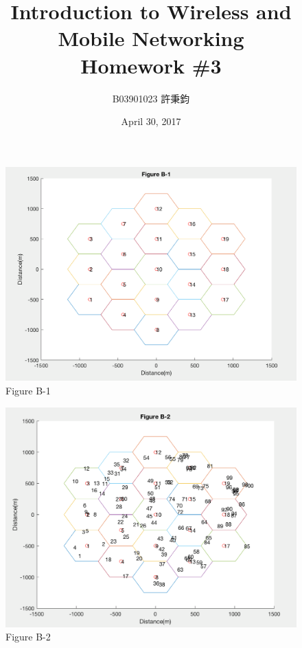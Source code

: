 \documentclass{article}
\title{Introduction to Wireless and Mobile Networking\\ Homework \#3}
\author{B03901023 許秉鈞}
\date{April 30, 2017} %
\begin{document}
\maketitle

\begin{figure}[h]
    \centering
    \includegraphics[width=1\textwidth]{fig1}
    \caption{Figure B-1}
    \label{fig:mesh1}
\end{figure}

\begin{figure}[h]
    \centering
    \includegraphics[width=1\textwidth]{fig2}
    \caption{Figure B-2}
    \label{fig:mesh2}
\end{figure}
\end{document}

